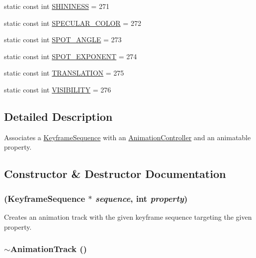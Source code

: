 \begin{CompactItemize}
static const int \hyperlink{classm3g_1_1AnimationTrack_f0b58ddb4173a8d2f5a730dab30e6c6f}{SHININESS} = 271
\item 
static const int \hyperlink{classm3g_1_1AnimationTrack_a0119030157ee8a5ef4f8ce88771447b}{SPECULAR\_\-COLOR} = 272
\item 
static const int \hyperlink{classm3g_1_1AnimationTrack_c1d6b5313ef35ef100889ca885901db2}{SPOT\_\-ANGLE} = 273
\item 
static const int \hyperlink{classm3g_1_1AnimationTrack_90c55bd356e55166244416c6f758ea94}{SPOT\_\-EXPONENT} = 274
\item 
static const int \hyperlink{classm3g_1_1AnimationTrack_a691826dccd8c22144e61216de4f680c}{TRANSLATION} = 275
\item 
static const int \hyperlink{classm3g_1_1AnimationTrack_f248c44b5d4962472c6533cdeffc6fe9}{VISIBILITY} = 276
\end{CompactItemize}


\subsection{Detailed Description}
Associates a \hyperlink{classm3g_1_1KeyframeSequence}{KeyframeSequence} with an \hyperlink{classm3g_1_1AnimationController}{AnimationController} and an animatable property. 

\subsection{Constructor \& Destructor Documentation}
\hypertarget{classm3g_1_1AnimationTrack_e27012f60e982597d6e504c488e51106}{
\subsubsection[{AnimationTrack}]{ ({\bf KeyframeSequence} $\ast$ {\em sequence}, \/  int {\em property})}}
\label{classm3g_1_1AnimationTrack_e27012f60e982597d6e504c488e51106}


Creates an animation track with the given keyframe sequence targeting the given property. \hypertarget{classm3g_1_1AnimationTrack_f7f1bc360c298d4a2f2436889159205c}{
\subsubsection[{$\sim$AnimationTrack}]{\setlength{\rightskip}{0pt plus 5cm}$\sim${\bf AnimationTrack} ()}}
\label{classm3g_1_1AnimationTrack_f7f1bc360c298d4a2f2436889159205c}


